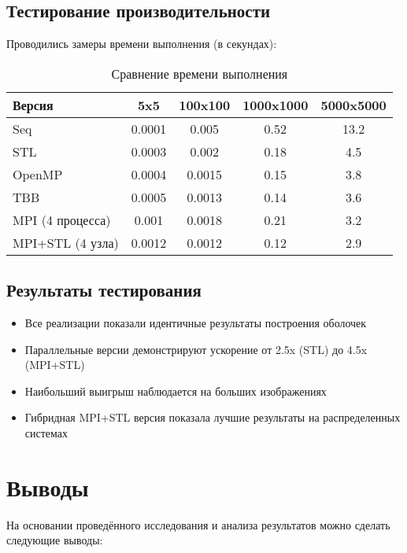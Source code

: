 \documentclass[12pt]{article}
\begin{document}
\subsection{Тестирование производительности}
Проводились замеры времени выполнения (в секундах):

\begin{table}[h]
\centering
\caption{Сравнение времени выполнения}
\begin{tabular}{|l|c|c|c|c|}
\hline
Версия & 5x5 & 100x100 & 1000x1000 & 5000x5000 \\
\hline
Seq & 0.0001 & 0.005 & 0.52 & 13.2 \\
STL & 0.0003 & 0.002 & 0.18 & 4.5 \\
OpenMP & 0.0004 & 0.0015 & 0.15 & 3.8 \\
TBB & 0.0005 & 0.0013 & 0.14 & 3.6 \\
MPI (4 процесса) & 0.001 & 0.0018 & 0.21 & 3.2 \\
MPI+STL (4 узла) & 0.0012 & 0.0012 & 0.12 & 2.9 \\
\hline
\end{tabular}
\end{table}

\subsection{Результаты тестирования}
\begin{itemize}
    \item Все реализации показали идентичные результаты построения оболочек
    \item Параллельные версии демонстрируют ускорение от 2.5x (STL) до 4.5x (MPI+STL)
    \item Наибольший выигрыш наблюдается на больших изображениях
    \item Гибридная MPI+STL версия показала лучшие результаты на распределенных системах
\end{itemize}

\section{Выводы}

На основании проведённого исследования и анализа результатов можно сделать следующие выводы:
\end{document}
